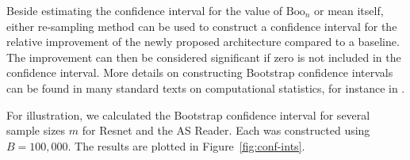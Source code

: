 \documentclass{article}
\newcommand{\cbtcn}{\gls{cbtcn}\xspace}
\newcommand{\ml}{\gls{ml}\xspace}
\newcommand{\boo}[1]{\text{Boo}_{#1}}
\newcommand{\Em}[1]{\boo{#1}}
\newcommand{\emn}{\Em{n}}
\begin{document}
\begin{appendices}
Beside estimating the confidence interval for the value of $\emn$ or mean itself, either re-sampling method can be used to construct a confidence interval for the relative improvement of the newly proposed architecture compared to a baseline. The improvement can then be considered significant if zero is not included in the confidence interval. More details on constructing Bootstrap confidence intervals can be found in many standard texts on computational statistics, for instance in \cite{efron1987better}.

For illustration, we calculated the Bootstrap confidence interval for several sample sizes $m$ for Resnet and the AS Reader. Each was constructed using $B=100,000$. The results are plotted in Figure~\ref{fig:conf-ints}.%











\end{appendices}
\end{document}
